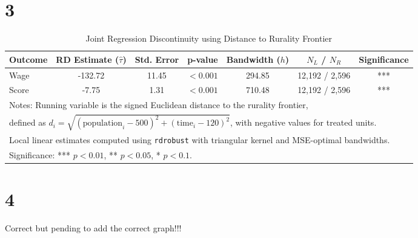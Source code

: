 \documentclass{article}
\begin{document}
\section{3}


\begin{table}[H]
\centering
\caption{Joint Regression Discontinuity using Distance to Rurality Frontier}
\label{tab:rd_rurality}
\begin{tabular}{lcccccc}
\hline
Outcome & RD Estimate ($\hat{\tau}$) & Std. Error & p-value & Bandwidth ($h$) & $N_L$ / $N_R$ & Significance \\
\hline
Wage  & -132.72 & 11.45 & $<0.001$ & 294.85 & 12,192 / 2,596 & *** \\
Score & -7.75   & 1.31  & $<0.001$ & 710.48 & 12,192 / 2,596 & *** \\
\hline
\multicolumn{7}{l}{\footnotesize Notes: Running variable is the signed Euclidean distance to the rurality frontier, }\\
\multicolumn{7}{l}{\footnotesize defined as $d_i = \sqrt{(\text{population}_i - 500)^2 + (\text{time}_i - 120)^2}$, with negative values for treated units.}\\
\multicolumn{7}{l}{\footnotesize Local linear estimates computed using \texttt{rdrobust} with triangular kernel and MSE-optimal bandwidths.}\\
\multicolumn{7}{l}{\footnotesize Significance: *** $p<0.01$, ** $p<0.05$, * $p<0.1$.}\\
\end{tabular}
\end{table}


\section{4}

Correct but pending to add the correct graph!!!
\end{document}
